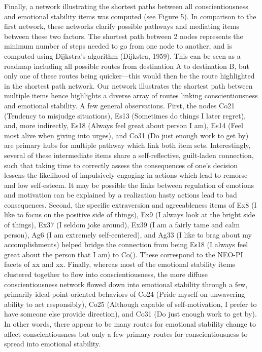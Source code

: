 \documentclass[english,man]{apa6}
\theoremstyle{definition}
\theoremstyle{definition}
\theoremstyle{remark}
\begin{document}
Finally, a network illustrating the shortest paths between all
conscientiousness and emotional stability items was computed (see Figure
5). In comparison to the first network, these networks clarify possible
pathways and mediating items between these two factors. The shortest
path between 2 nodes represents the minimum number of steps needed to go
from one node to another, and is computed using Dijkstra's algorithm
(Dijkstra, 1959). This can be seen as a roadmap including all possible
routes from destination A to destination B, but only one of these routes
being quicker---this would then be the route highlighted in the shortest
path network. Our network illustrates the shortest path between multiple
items hence highlights a diverse array of routes linking
conscientiousness and emotional stability. A few general observations.
First, the nodes Co21 (Tendency to misjudge situations), Es13 (Sometimes
do things I later regret), and, more indirectly, Es18 (Always feel great
about person I am), Es14 (Feel most alive when giving into urges), and
Co31 (Do just enough work to get by) are primary hubs for multiple
pathway which link both item sets. Interestingly, several of these
intermediate items share a self-reflective, guilt-laden connection, such
that taking time to correctly assess the consequences of one's decision
lessens the likelihood of impulsively engaging in actions which lead to
remorse and low self-esteem. It may be possible the links between
regulation of emotions and motivation can be explained by a realization
hasty actions lead to bad consequences. Second, the specific
extraversion and agreeableness items of Ex8 (I like to focus on the
positive side of things), Ex9 (I always look at the bright side of
things), Ex37 (I seldom joke around), Ex39 (I am a fairly tame and calm
person), Ag6 (I am extremely self-centered), and Ag33 (I like to brag
about my accomplishments) helped bridge the connection from being Es18
(I always feel great about the person that I am) to Co(). These
correspond to the NEO-PI facets of xx and xx. Finally, whereas most of
the emotional stability items clustered together to flow into
conscientiousness, the more diffuse conscientiousness network flowed
down into emotional stability through a few, primarily ideal-point
oriented behaviors of Co24 (Pride myself on unwavering ability to act
responsibly), Co25 (Although capable of self-motivation, I prefer to
have someone else provide direction), and Co31 (Do just enough work to
get by). In other words, there appear to be many routes for emotional
stability change to affect conscientiousness but only a few primary
routes for conscientiousness to spread into emotional stability.
\end{document}
